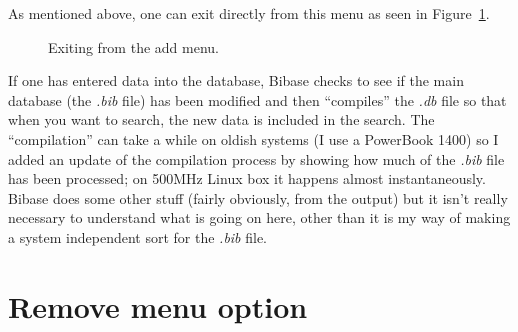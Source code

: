 \documentclass[12pt,a4paper]{book}
\newcommand {\fig}[1] {Figure~\ref{#1}}
\begin{document}
As mentioned above, one can exit directly from this menu as seen in 
\fig{fig:exitFromAdd}.
\begin{figure}[!ht]
\centerline{}
\caption{Exiting from the add menu.}
\label{fig:exitFromAdd}
\end{figure}
If one has entered data into the database, Bibase checks to see if the 
main database (the \emph{.bib} file) has been modified and then 
``compiles'' the \emph{.db} file so that when you want to search, the 
new data is included in the search.  The ``compilation'' can take a 
while on oldish systems (I use a PowerBook 1400) so I added an update 
of the compilation process by showing how much of the 
\emph{.bib} file has been processed; on 500MHz Linux box it happens 
almost instantaneously.  Bibase does some other stuff 
(fairly obviously, from the output) but it isn't really necessary to 
understand what is going on here, other than it is my way of making a 
system independent sort for the \emph{.bib} file.

\section{Remove menu option}
\end{document}
